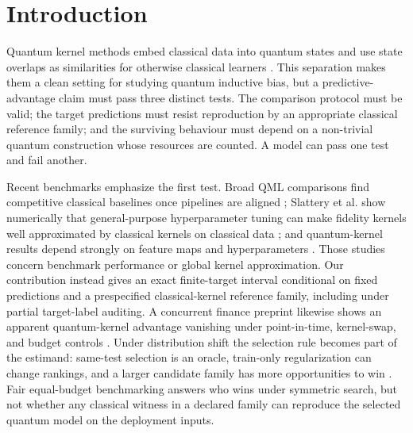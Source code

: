 \documentclass[referee,lineno,pdflatex,sn-nature]{sn-jnl}
\theoremstyle{thmstyleone}%
\theoremstyle{thmstyletwo}%
\theoremstyle{thmstylethree}%
\begin{document}
\section{Introduction}
\label{sec:introduction}

Quantum kernel methods embed classical data into quantum states and use state overlaps as similarities for otherwise classical learners \cite{havlicek2019quantumenhanced,schuld2019featurehilbert,schuld2021kernelmethods}. This separation makes them a clean setting for studying quantum inductive bias, but a predictive-advantage claim must pass three distinct tests. The comparison protocol must be valid; the target predictions must resist reproduction by an appropriate classical reference family; and the surviving behaviour must depend on a non-trivial quantum construction whose resources are counted. A model can pass one test and fail another.

Recent benchmarks emphasize the first test. Broad QML comparisons find competitive classical baselines once pipelines are aligned \cite{bowles2024betterthanclassical}; Slattery et al. show numerically that general-purpose hyperparameter tuning can make fidelity kernels well approximated by classical kernels on classical data \cite{slattery2023numerical}; and quantum-kernel results depend strongly on feature maps and hyperparameters \cite{schnabel2025scrutiny}. Those studies concern benchmark performance or global kernel approximation. Our contribution instead gives an exact finite-target interval conditional on fixed predictions and a prespecified classical-kernel reference family, including under partial target-label auditing. A concurrent finance preprint likewise shows an apparent quantum-kernel advantage vanishing under point-in-time, kernel-swap, and budget controls \cite{shen2026vanishing}. Under distribution shift the selection rule becomes part of the estimand: same-test selection is an oracle, train-only regularization can change rankings, and a larger candidate family has more opportunities to win \cite{gulrajani2021domainbed,koh2021wilds,yao2022wildtime,zhou2023dgsurvey}. Fair equal-budget benchmarking answers who wins under symmetric search, but not whether any classical witness in a declared family can reproduce the selected quantum model on the deployment inputs.
\end{document}
